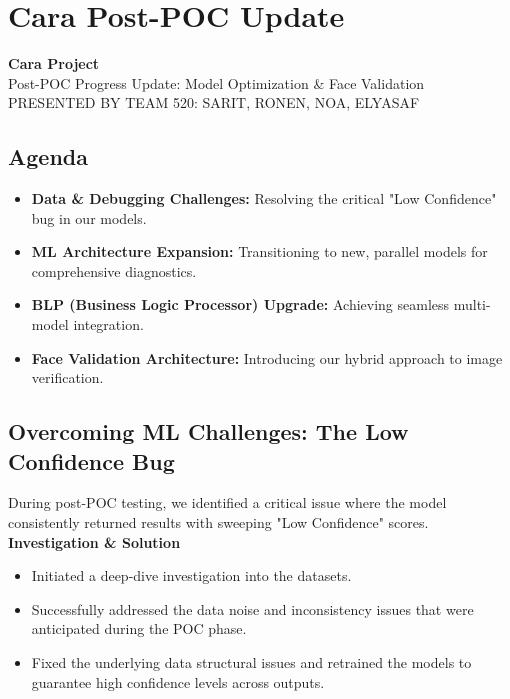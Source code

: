 \documentclass[12pt,a4paper]{article}
\begin{document}
\newpage
\section{Cara Post-POC Update}

\textbf{Cara Project}\\
Post-POC Progress Update: Model Optimization \& Face Validation\\
PRESENTED BY TEAM 520: SARIT, RONEN, NOA, ELYASAF

\subsection{Agenda}
\begin{itemize}
    \item \textbf{Data \& Debugging Challenges:} Resolving the critical "Low Confidence" bug in our models.
    \item \textbf{ML Architecture Expansion:} Transitioning to new, parallel models for comprehensive diagnostics.
    \item \textbf{BLP (Business Logic Processor) Upgrade:} Achieving seamless multi-model integration.
    \item \textbf{Face Validation Architecture:} Introducing our hybrid approach to image verification.
\end{itemize}

\subsection{Overcoming ML Challenges: The Low Confidence Bug}
During post-POC testing, we identified a critical issue where the model consistently returned results with sweeping "Low Confidence" scores.\\
\textbf{Investigation \& Solution}
\begin{itemize}
    \item Initiated a deep-dive investigation into the datasets.
    \item Successfully addressed the data noise and inconsistency issues that were anticipated during the POC phase.
    \item Fixed the underlying data structural issues and retrained the models to guarantee high confidence levels across outputs.
\end{itemize}
\end{document}
